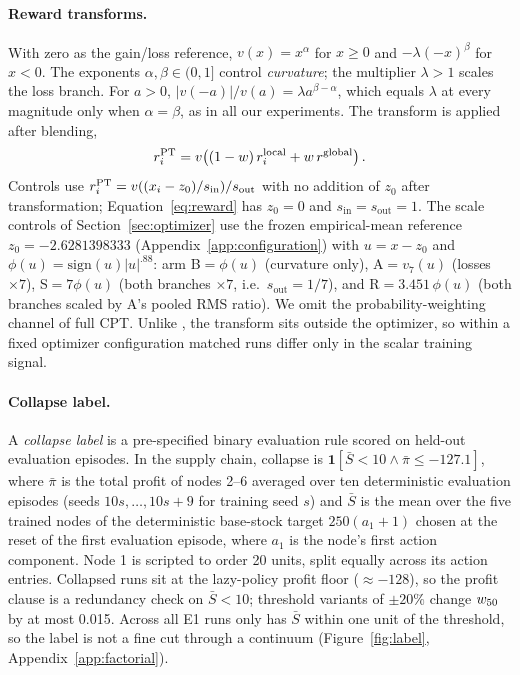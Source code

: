 \paragraph{Reward transforms.}
With zero as the gain/loss reference, $v(x)=x^\alpha$ for $x\ge0$ and $-\lambda(-x)^\beta$ for $x<0$.
The exponents $\alpha,\beta\in(0,\allowbreak 1]$ control \emph{curvature}; the multiplier $\lambda>1$
scales the loss branch. For $a>0$, $|v(-a)|/v(a)=\lambda a^{\beta-\alpha}$, which equals $\lambda$ at
every magnitude only when $\alpha=\beta$, as in all our experiments. The transform is applied after
blending,
\begin{equation}
 r_i^{\mathrm{PT}}=v\!\left((1-w)\,r_i^{\mathrm{local}}+w\,r^{\mathrm{global}}\right).
 \label{eq:reward}
\end{equation}
Controls use $r_i^{\mathrm{PT}}=v((x_i-z_0)/s_{\mathrm{in}})/s_{\mathrm{out}}$ with no addition of $z_0$ after
transformation; Equation~\ref{eq:reward} has $z_0=0$ and $s_{\mathrm{in}}=s_{\mathrm{out}}=1$. The scale
controls of Section~\ref{sec:optimizer} use the frozen empirical-mean reference $z_0=-2.6281398333$
(Appendix~\ref{app:configuration}) with $u=x-z_0$ and $\phi(u)=\mathrm{sign}(u)|u|^{.88}$: arm
B$=\phi(u)$ (curvature only), A$=v_7(u)$ (losses $\times7$), S$=7\phi(u)$ (both branches $\times7$,
i.e.\ $s_{\mathrm{out}}=1/7$), and R$=3.451\,\phi(u)$ (both branches scaled by A's pooled RMS ratio).
We omit the probability-weighting channel of full CPT. Unlike \citet{lalmohammed2025}, the transform
sits outside the optimizer, so within a fixed optimizer configuration matched runs differ only in the
scalar training signal.

\paragraph{Collapse label.}
A \emph{collapse label} is a pre-specified binary evaluation rule scored on held-out evaluation
episodes. In the supply chain, collapse is $\mathbf{1}[\bar S<10\wedge\bar\pi\le-127.1]$, where
$\bar\pi$ is the total profit of nodes 2--6 averaged over ten deterministic evaluation episodes
(seeds $10s,\dots,10s+9$ for training seed $s$) and $\bar S$ is the mean over the five trained nodes of
the deterministic base-stock target $250(a_1+1)$ chosen at the reset of the first evaluation episode,
where $a_1$ is the node's first action component. Node 1 is scripted to order 20 units, split equally
across its action entries. Collapsed runs sit at the lazy-policy profit floor ($\approx-128$), so the
profit clause is a redundancy check on $\bar S<10$; threshold variants of $\pm20\%$ change $w_{50}$ by
at most 0.015. Across all \VrevLabelN{} E1 runs only \VrevLabelNearS{} has $\bar S$ within one unit of the
threshold, so the label is not a fine cut through a continuum (Figure~\ref{fig:label}, Appendix~\ref{app:factorial}).

